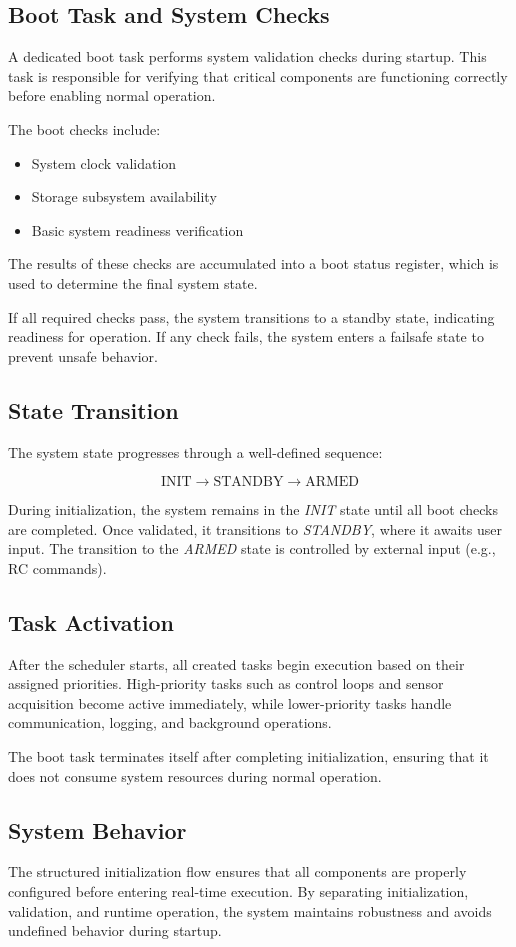 \subsection{Boot Task and System Checks}

A dedicated boot task performs system validation checks during startup. This task is responsible for verifying that critical components are functioning correctly before enabling normal operation.

The boot checks include:
\begin{itemize}
    \item System clock validation
    \item Storage subsystem availability
    \item Basic system readiness verification
\end{itemize}

The results of these checks are accumulated into a boot status register, which is used to determine the final system state.

If all required checks pass, the system transitions to a standby state, indicating readiness for operation. If any check fails, the system enters a failsafe state to prevent unsafe behavior.

\subsection{State Transition}

The system state progresses through a well-defined sequence:

\[
\text{INIT} \rightarrow \text{STANDBY} \rightarrow \text{ARMED}
\]

During initialization, the system remains in the \textit{INIT} state until all boot checks are completed. Once validated, it transitions to \textit{STANDBY}, where it awaits user input. The transition to the \textit{ARMED} state is controlled by external input (e.g., RC commands).

\subsection{Task Activation}

After the scheduler starts, all created tasks begin execution based on their assigned priorities. High-priority tasks such as control loops and sensor acquisition become active immediately, while lower-priority tasks handle communication, logging, and background operations.

The boot task terminates itself after completing initialization, ensuring that it does not consume system resources during normal operation.

\subsection{System Behavior}

The structured initialization flow ensures that all components are properly configured before entering real-time execution. By separating initialization, validation, and runtime operation, the system maintains robustness and avoids undefined behavior during startup.
